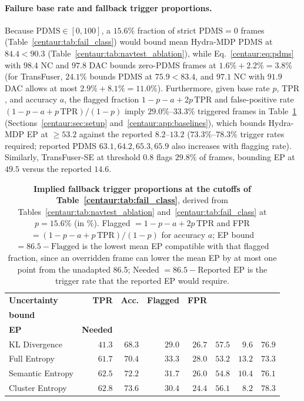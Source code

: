 \paragraph{Failure base rate and fallback trigger proportions.} Because $\mathrm{PDMS} \in [0, 100]$, a $15.6\%$ fraction of strict $\mathrm{PDMS}=0$ frames (Table~\ref{centaur:tab:fail_class}) would bound mean Hydra-MDP PDMS at $84.4 < 90.3$ (Table~\ref{centaur:tab:navtest_ablation}), while Eq.~\eqref{centaur:eq:pdms} with $98.4$ NC and $97.8$ DAC bounds zero-PDMS frames at $1.6\% + 2.2\% = 3.8\%$ (for TransFuser, $24.1\%$ bounds PDMS at $75.9 < 83.4$, and $97.1$ NC with $91.9$ DAC allows at most $2.9\% + 8.1\% = 11.0\%$). Furthermore, given base rate $p$, $\mathrm{TPR}$, and accuracy $a$, the flagged fraction $1 - p - a + 2p\,\mathrm{TPR}$ and false-positive rate $(1 - p - a + p\,\mathrm{TPR})/(1 - p)$ imply $29.0\%$--$33.3\%$ triggered frames in Table~\ref{centaur:tab:implied_rates} (Sections~\ref{centaur:sec:setup} and~\ref{centaur:app:baselines}), which bounds Hydra-MDP EP at $\ge 53.2$ against the reported $8.2$--$13.2$ ($73.3\%$--$78.3\%$ trigger rates required; reported PDMS $63.1, 64.2, 65.3, 65.9$ also increases with flagging rate). Similarly, TransFuser-SE at threshold $0.8$ flags $29.8\%$ of frames, bounding EP at $49.5$ versus the reported $14.6$.

\begin{table}[t]
  \centering
  \caption[Implied fallback trigger proportions]{\textbf{Implied fallback trigger proportions at the cutoffs of Table~\ref{centaur:tab:fail_class}}, derived from Tables~\ref{centaur:tab:navtest_ablation} and~\ref{centaur:tab:fail_class} at $p=15.6$\% (in \%). Flagged $= 1 - p - a + 2p\,\mathrm{TPR}$ and FPR $= (1 - p - a + p\,\mathrm{TPR})/(1-p)$ for accuracy $a$; EP bound $= 86.5 - \text{Flagged}$ is the lowest mean EP compatible with that flagged fraction, since an overridden frame can lower the mean EP by at most one point from the unadapted 86.5; Needed $= 86.5 - \text{Reported EP}$ is the trigger rate that the reported EP would require.}
  \label{centaur:tab:implied_rates}
  \small
  \setlength{\tabcolsep}{4pt}
  \begin{tabular}{l|rr|rr|rrr}
    \toprule
    \textbf{Uncertainty} & \textbf{TPR} & \textbf{Acc.} & \textbf{Flagged} & \textbf{FPR} & \makecell{\textbf{EP}\\\textbf{bound}} & \makecell{\textbf{Reported}\\\textbf{EP}} & \textbf{Needed} \\
    \midrule
    KL Divergence & $41.3$ & $68.3$ & $29.0$ & $26.7$ & $57.5$ & $9.6$ & $76.9$ \\
    Full Entropy & $61.7$ & $70.4$ & $33.3$ & $28.0$ & $53.2$ & $13.2$ & $73.3$ \\
    Semantic Entropy & $62.5$ & $72.2$ & $31.7$ & $26.0$ & $54.8$ & $10.4$ & $76.1$ \\
    Cluster Entropy & $62.8$ & $73.6$ & $30.4$ & $24.4$ & $56.1$ & $8.2$ & $78.3$ \\
    \bottomrule
  \end{tabular}
\end{table}

